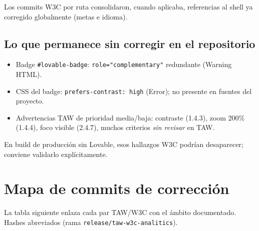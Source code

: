 \documentclass[11pt,a4paper]{article}
\begin{document}
Los commits W3C por ruta consolidaron, cuando aplicaba, referencias al shell ya corregido globalmente (metas e idioma).

\subsection{Lo que permanece sin corregir en el repositorio}

\begin{itemize}[noitemsep]
  \item Badge \texttt{\#lovable-badge}: \texttt{role="complementary"} redundante (Warning HTML).
  \item CSS del badge: \texttt{prefers-contrast: high} (Error); no presente en fuentes del proyecto.
  \item Advertencias TAW de prioridad media/baja: contraste (1.4.3), zoom 200\% (1.4.4), foco visible (2.4.7), muchos criterios \emph{sin revisar} en TAW.
\end{itemize}

En build de producción sin Lovable, esos hallazgos W3C podrían desaparecer; conviene validarlo explícitamente.

\section{Mapa de commits de corrección}

La tabla siguiente enlaza cada par TAW/W3C con el ámbito documentado. Hashes abreviados (rama \texttt{release/taw-w3c-analitics}).
\end{document}
